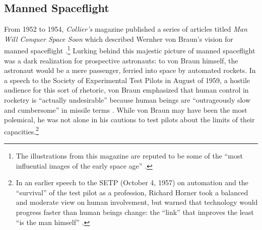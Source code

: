 
\subsection{Manned Spaceflight}


From 1952 to 1954, \emph{Collier's} magazine published a series of articles
titled \emph{Man Will Conquer Space Soon} which described Wernher von
Braun's vision for manned spaceflight \cite{scribdColliers}
\cite{dreamsofspace}.\footnote{The illustrations from this magazine
  are reputed to be some of the ``most influential images of the early
space age'' \cite[p. 9]{marketingMoon}.} Lurking behind this majestic
picture of manned spaceflight was a dark 
realization for prospective astronauts: to von Braun himself, the
astronaut would be a mere passenger, ferried into space by automated
rockets. In a speech to the Society of Experimental Test Pilots in
August of 1959, a hostile audience for this sort of rhetoric, von
Braun emphasized that human control in rocketry is ``actually
undesirable'' because human beings are ``outrageously slow and
cumbersome'' in missile terms \cite[p. 66-67]{DM}. While von Braun
may have been the most polemical, he was not alone in his cautions to
test pilots about the limits of their capacities.\footnote{In an
  earlier speech to the SETP (October 4, 1957) on automation and 
the ``survival'' of the test pilot as a profession, Richard Horner
took a balanced and moderate view on human involvement, but warned
that technology would progress faster than human beings change:
the ``link'' that improves the least ``is the man himself'' \cite[p. 19]{DM}.}

